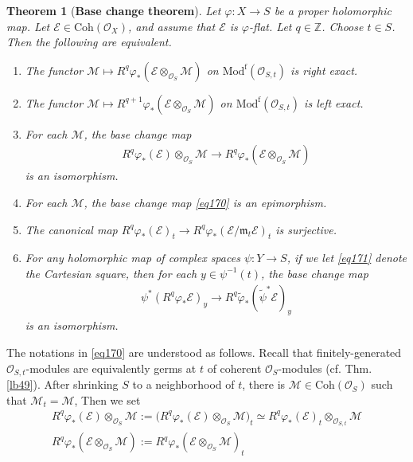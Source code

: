 \documentclass[12pt,b5paper,notitlepage]{report}
\theoremstyle{definition}
\theoremstyle{plain}
\newtheorem{thm}[df]{Theorem}
\newcommand{\mc}{\mathcal}
\newcommand{\wtd}{\widetilde}
\newcommand{\scr}{\mathscr}
\newcommand{\Zbb}{\mathbb Z}
\newcommand{\mk}{\mathfrak m}
\newcommand{\Coh}{\mathrm{Coh}}
\newcommand{\Modf}{\mathrm{Mod}^{\mathrm f}}
\numberwithin{equation}{section}
\begin{document}
\begin{thm}[\textbf{Base change theorem}]\label{lb338}
Let $\varphi:X\rightarrow S$ be a proper holomorphic map. Let $\scr E\in\Coh(\scr O_X)$, and assume that $\scr E$ is $\varphi$-flat. Let $q\in\Zbb$. Choose $t\in S$. Then the following are equivalent. 
\begin{enumerate}[label=(\alph*)]
\item The functor $\mc M\mapsto R^q\varphi_*(\scr E\otimes_{\scr O_S}\mc M)$  on $\Modf(\scr O_{S,t})$ is right exact.
\item The functor $\mc M\mapsto R^{q+1}\varphi_*(\scr E\otimes_{\scr O_S}\mc M)$   on $\Modf(\scr O_{S,t})$  is left exact.
\item For each $\mc M$, the base change map
\begin{align}
R^q\varphi_*(\scr E)\otimes_{\scr O_S}\mc M\rightarrow R^q\varphi_*(\scr E\otimes_{\scr O_S}\mc M)  \label{eq170}
\end{align}
is an isomorphism.
\item For each $\mc M$, the base change map \eqref{eq170} is an epimorphism.
\item The canonical map $R^q\varphi_*(\scr E)_t\rightarrow R^q\varphi_*(\scr E/\mk_t\scr E)_t$ is surjective.
\item For any holomorphic map of complex spaces $\psi:Y\rightarrow S$, if we let \eqref{eq171} denote the Cartesian square, then for each $y\in\psi^{-1}(t)$, the base change map 
\begin{align}
\psi^*(R^q\varphi_*\scr E)_y\rightarrow R^q\wtd\varphi_*(\wtd\psi^*\scr E)_y \label{eq175}
\end{align}
is an isomorphism. 
\end{enumerate}
\end{thm}


The notations in \eqref{eq170} are understood as follows. Recall that finitely-generated $\scr O_{S,t}$-modules are equivalently germs at $t$ of coherent $\scr O_S$-modules (cf. Thm. \ref{lb49}). After shrinking $S$ to a neighborhood of $t$, there is $\scr M\in\Coh(\scr O_S)$ such that $\scr M_t=\mc M$, Then we set
\begin{gather*}
R^q\varphi_*(\scr E)\otimes_{\scr O_S}\mc M:=\big(R^q\varphi_*(\scr E)\otimes_{\scr O_S}\scr M\big)_t\simeq R^q\varphi_*(\scr E)_t\otimes_{\scr O_{S,t}}\mc M\\
R^q\varphi_*(\scr E\otimes_{\scr O_S}\mc M):=R^q\varphi_*(\scr E\otimes_{\scr O_S}\scr M)_t
\end{gather*} 
\end{document}
